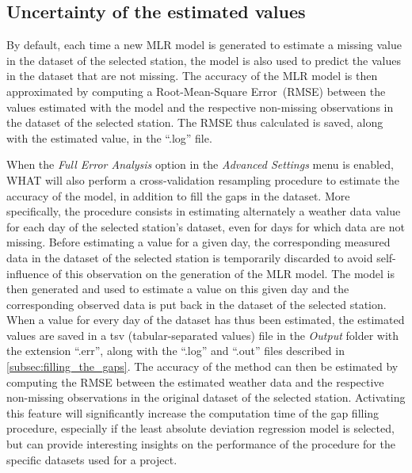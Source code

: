\documentclass[WHATMANUAL.tex]{subfiles}
\begin{document}
\subsection{Uncertainty of the estimated values}

By default, each time a new MLR model is generated to estimate a missing value in the dataset of the selected station, the model is also used to predict the values in the dataset that are not missing. The accuracy of the MLR model is then approximated by computing a Root-Mean-Square Error~(RMSE) between the values estimated with the model and the respective non-missing observations in the dataset of the selected station. The RMSE thus calculated is saved, along with the estimated value, in the ``.log'' file.

When the \emph{Full Error Analysis} option in the \emph{Advanced Settings} menu is enabled, WHAT will also perform a cross-validation resampling procedure to estimate the accuracy of the model, in addition to fill the gaps in the dataset. More specifically, the procedure consists in estimating alternately a weather data value for each day of the selected station's dataset, even for days for which data are not missing. Before estimating a value for a given day, the corresponding measured data in the dataset of the selected station is temporarily discarded to avoid self-influence of this observation on the generation of the MLR model. The model is then generated and used to estimate a value on this given day and the corresponding observed data is put back in the dataset of the selected station. When a value for every day of the dataset has thus been estimated, the estimated values are saved in a tsv (tabular-separated values) file in the \emph{Output} folder with the extension ``.err'', along with the ``.log'' and ``.out'' files described in \cref{subsec:filling_the_gaps}. The accuracy of the method can then be estimated by computing the RMSE between the estimated weather data and the respective non-missing observations in the original dataset of the selected station. Activating this feature will significantly increase the computation time of the gap filling procedure, especially if the least absolute deviation regression model is selected, but can provide interesting insights on the performance of the procedure for the specific datasets used for a project.
\end{document}
